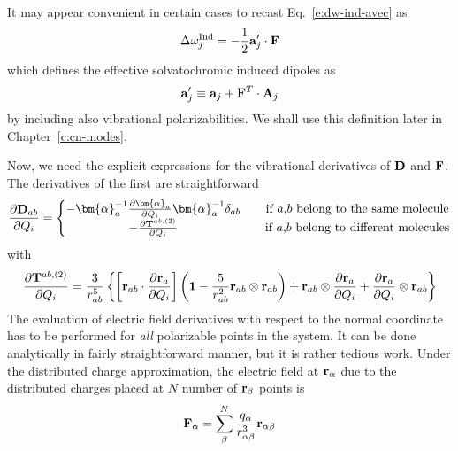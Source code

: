 \documentclass[b5paper,oneside,fleqn,11pt]{book}
\newcommand{\BM}[1]{\bm{#1}}
\newcommand{\fderiv}[2]{\ensuremath{
    \frac{\partial #1}{\partial #2}}}
\begin{document}
\begin{refsection}
It may appear convenient in certain cases
to recast Eq.~\eqref{e:dw-ind-avec} as
%
\begin{equation}\label{e:dw-ind-avec-alternative}
\Delta\omega_j^{\rm Ind} = - \frac{1}{2}   {\bf a}_j' \cdot {\bf F} 
\end{equation}
%
which defines the effective solvatochromic induced dipoles as 
%
\begin{equation}\label{e:avec-prime}
{\bf a}_j' \equiv {\bf a}_j + {\bf F}^T \cdot {\bf A}_j
\end{equation}
% 
by including also vibrational polarizabilities. We shall use this definition
later in Chap\-ter~\ref{c:cn-modes}.

Now, we need the explicit expressions for the vibrational
derivatives of $\bf D$ and $\bf F$. The derivatives of the first are straightforward
%
\begin{equation}
\fderiv{{\bf D}_{ab}}{Q_i} = 
\left\{\begin{matrix}               
-{\BM \alpha}_a^{-1} \fderiv{{\BM \alpha}_a}{Q_i} {\BM \alpha}_a^{-1} 
                       \delta_{ab} && \text{if $a$,$b$ belong to the same molecule} \\
-\fderiv{{\bf T}^{ab,(2)}}{Q_i}  && \text{if $a$,$b$ belong to different molecules}
\end{matrix}\right. 
\end{equation}
%
with
%
\begin{equation}
\fderiv{{\bf T}^{ab,(2)}}{Q_i} = \frac{3}{r_{ab}^5} 
       \left\{ 
           \left[ 
                {\bf r}_{ab} \cdot \fderiv{{\bf r}_{a}}{Q_i} 
           \right]
           \left(
                 {\bf 1} -
                 \frac{5}{r_{ab}^2} {\bf r}_{ab} \otimes {\bf r}_{ab} 
           \right) +
                 {\bf r}_{ab} \otimes \fderiv{{\bf r}_{a}}{Q_i} + \fderiv{{\bf r}_{a}}{Q_i} \otimes {\bf r}_{ab}
       \right\}
\end{equation}
%
The evaluation of electric field derivatives with respect to the normal coordinate 
has to be performed for \emph{all} polarizable points in the system. 
It can be done analytically
in fairly straightforward manner, but it is rather tedious work. 
Under the distributed charge approximation, 
the electric field at ${\bf r}_\alpha$ due to the 
distributed charges placed at $N$ number of ${\bf r}_\beta$ points is
%
\begin{equation}
{\bf F}_\alpha = \sum_\beta^N \frac{q_\alpha}{r_{\alpha\beta}^3} {\bf r}_{\alpha\beta}
\end{equation}

\end{refsection}
\end{document}
